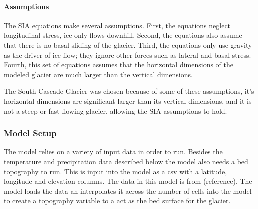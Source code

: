 \documentclass{article}
\begin{document}
\paragraph{Assumptions}

The SIA equations make several assumptions. First, the equations neglect longitudinal stress, ice only flows downhill. Second, the equations 
also assume that there is no basal sliding of the glacier. Third, the equations only use gravity as the driver of ice flow; they ignore other 
forces such as lateral and basal stress. Fourth, this set of equations assumes that the horizontal dimensions of the modeled glacier are much 
larger than the vertical dimensions.

The South Cascade Glacier was chosen because of some of these assumptions, it's horizontal dimensions are significant larger than its vertical 
dimensions, and it is not a steep or fast flowing glacier, allowing the SIA assumptions to hold.

\subsubsection{Model Setup}
The model relies on a variety of input data in order to run. Besides the temperature and precipitation data described below the model also 
needs a bed topography to run. This is input into the model as a csv with a latitude, longitude and elevation columns. The data in this model 
is from (reference). The model loads the data an interpolates it across the number of cells into the model to create a topography variable to a
act as the bed surface for the glacier. 
\end{document}
